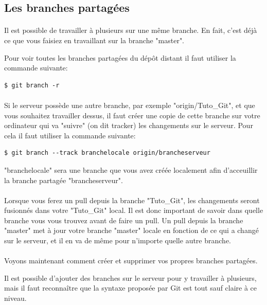 \documentclass[french, a4paper, 12pt, titlepage]{article}
\begin{document}
\subsection{Les branches partagées}
\paragraph{}Il est possible de travailler à plusieurs sur une même branche. En fait, c’est déjà ce que vous faisiez en travaillant sur la branche "master".

Pour voir toutes les branches partagées du dépôt distant il faut utiliser la commande suivante:
\begin{lstlisting}
$ git branch -r
\end{lstlisting}

\paragraph{}Si le serveur possède une autre branche, par exemple "origin/Tuto\_Git", et que vous souhaitez travailler dessus, il faut créer une copie de cette branche sur votre ordinateur qui va "suivre" (on dit tracker) les changements sur le serveur. Pour cela il faut utiliser la commande suivante:
\begin{lstlisting}
$ git branch --track branchelocale origin/brancheserveur
\end{lstlisting}
"branchelocale" sera une branche que vous avez créée localement afin d'acceuillir la branche partagée "brancheserveur".

\paragraph{}Lorsque vous ferez un pull depuis la branche "Tuto\_Git", les changements seront fusionnés dans votre "Tuto\_Git" local. Il est donc important de savoir dans quelle branche vous vous trouvez avant de faire un pull. Un pull depuis la branche "master" met à jour votre branche "master" locale en fonction de ce qui a changé sur le serveur, et il en va de même pour n’importe quelle autre branche.

\paragraph{}Voyons maintenant comment créer et supprimer vos propres branches partagées.

Il est possible d’ajouter des branches sur le serveur pour y travailler à plusieurs, mais il faut reconnaître que la syntaxe proposée par Git est tout sauf claire à ce niveau.
\end{document}
